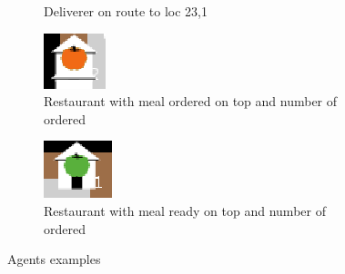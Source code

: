 \begin{figure}
\begin{subfigure}[m]{0.1\textwidth}
         \caption{Deliverer on route to loc 23,1}
     \end{subfigure}
     \hfill
     \begin{subfigure}[m]{0.1\textwidth}
         \centering
         \includegraphics[width=\textwidth]{sections/pics/meal_prep}
         \caption{Restaurant with meal ordered on top and number of ordered}
     \end{subfigure}
      \hfill
     \begin{subfigure}[m]{0.1\textwidth}
         \centering
         \includegraphics[width=\textwidth]{sections/pics/meal_ready}
         \caption{Restaurant with meal ready on top and number of ordered}
     \end{subfigure}
        \caption{Agents examples}
        \label{fig:agents}
\end{figure}

